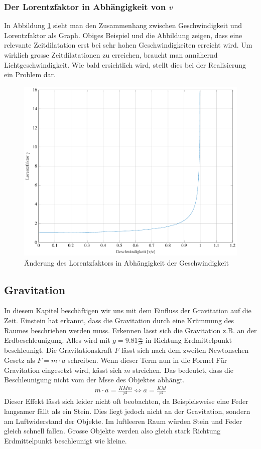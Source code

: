 \begin{refsection}
\subsubsection{Der Lorentzfaktor in Abhängigkeit von $v$}
In Abbildung \ref{skript:zeitreisen:fig:lorentz} sieht man den Zusammenhang zwischen Geschwindigkeit und Lorentzfaktor als Graph. Obiges Beispiel und die Abbildung zeigen, dass eine relevante Zeitdilatation erst bei sehr hohen Geschwindigkeiten erreicht wird. Um wirklich grosse Zeitdilatationen zu erreichen, braucht man annähernd Lichtgeschwindigkeit. Wie bald ersichtlich wird, stellt dies bei der Realisierung ein Problem dar.
\begin{figure}[H]
   \centering
   \includegraphics[width=12cm]{zeitreisen/tikz/lorentz.pdf}
   \caption{Änderung des Lorentzfaktors in Abh\"angigkeit der Geschwindigkeit}
   \label{skript:zeitreisen:fig:lorentz} 
\end{figure}
\subsection{Gravitation} \label{Gravitation}

	In diesem Kapitel beschäftigen wir uns mit dem Einfluss der Gravitation auf die Zeit. Einstein hat erkannt, dass die Gravitation durch eine Krümmung des Raumes beschrieben werden muss. Erkennen lässt sich die Gravitation z.B. an der Erdbeschleunigung. Alles wird mit $g=9.81\frac{m}{s^2}$ in Richtung Erdmittelpunkt beschleunigt. Die Gravitationskraft $F$ lässt sich nach dem zweiten Newtonschen Gesetz als $F=m\cdot a$ schreiben. Wenn dieser Term nun in die Formel Für Gravitation eingesetzt wird, kässt sich $m$ streichen. Das bedeutet, dass die Beschleunigung nicht vom der Msse des Objektes abhängt.
	\begin{align*}
		m\cdot a = \frac{KMm}{r^2} \Leftrightarrow a=\frac{KM}{r^2} 
	\end{align*}
	Dieser Effekt lässt sich leider nicht oft beobachten, da Beispielsweise eine Feder langsamer fällt als ein Stein. Dies liegt jedoch nicht an der Gravitation, sondern am Luftwiderstand der Objekte. Im luftleeren Raum würden Stein und Feder gleich schnell fallen. Grosse Objekte werden also gleich stark Richtung Erdmittelpunkt beschleunigt wie kleine.
	

\end{refsection}
